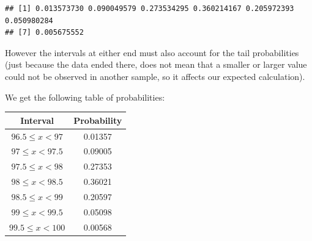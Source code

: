 \documentclass[
]{book}
\newenvironment{Shaded}{\begin{snugshade}}{\end{snugshade}}
\newcommand{\CommentTok}[1]{\textcolor[rgb]{0.56,0.35,0.01}{\textit{#1}}}
\newcommand{\ControlFlowTok}[1]{\textcolor[rgb]{0.13,0.29,0.53}{\textbf{#1}}}
\newcommand{\DataTypeTok}[1]{\textcolor[rgb]{0.13,0.29,0.53}{#1}}
\newcommand{\DecValTok}[1]{\textcolor[rgb]{0.00,0.00,0.81}{#1}}
\newcommand{\KeywordTok}[1]{\textcolor[rgb]{0.13,0.29,0.53}{\textbf{#1}}}
\newcommand{\NormalTok}[1]{#1}
\newcommand{\OperatorTok}[1]{\textcolor[rgb]{0.81,0.36,0.00}{\textbf{#1}}}
\newcommand{\StringTok}[1]{\textcolor[rgb]{0.31,0.60,0.02}{#1}}
\theoremstyle{definition}
\theoremstyle{definition}
\theoremstyle{definition}
\theoremstyle{definition}
\theoremstyle{remark}
\begin{document}
\begin{Shaded}
\end{Shaded}

\begin{verbatim}
## [1] 0.013573730 0.090049579 0.273534295 0.360214167 0.205972393 0.050980284
## [7] 0.005675552
\end{verbatim}

However the intervals at either end must also account for the tail probabilities (just because the data ended there, does not mean that a smaller or larger value could not be observed in another sample, so it affects our expected calculation).

We get the following table of probabilities:

\begin{longtable}[]{@{}cc@{}}
\toprule
Interval & Probability\tabularnewline
\midrule
\endhead
\(96.5\leq x < 97\) & 0.01357\tabularnewline
\(97\leq x < 97.5\) & 0.09005\tabularnewline
\(97.5\leq x < 98\) & 0.27353\tabularnewline
\(98\leq x < 98.5\) & 0.36021\tabularnewline
\(98.5\leq x < 99\) & 0.20597\tabularnewline
\(99\leq x < 99.5\) & 0.05098\tabularnewline
\(99.5\leq x < 100\) & 0.00568\tabularnewline
\bottomrule
\end{longtable}
\end{document}
